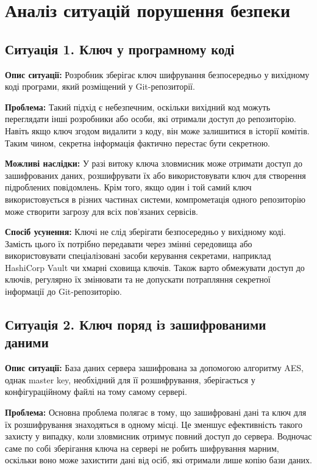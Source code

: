 \section{Аналіз ситуацій порушення безпеки}

\subsection{Ситуація 1. Ключ у програмному коді}

\textbf{Опис ситуації:}
Розробник зберігає ключ шифрування безпосередньо у вихідному коді програми, який розміщений у Git-репозиторії.

\textbf{Проблема:}
Такий підхід є небезпечним, оскільки вихідний код можуть переглядати інші розробники або особи, 
які отримали доступ до репозиторію. Навіть якщо ключ згодом видалити з коду, він може залишитися в історії комітів. 
Таким чином, секретна інформація фактично перестає бути секретною.

\textbf{Можливі наслідки:}
У разі витоку ключа зловмисник може отримати доступ до зашифрованих даних, розшифрувати їх або використовувати ключ 
для створення підроблених повідомлень. Крім того, якщо один і той самий ключ використовується в різних частинах системи, 
компрометація одного репозиторію може створити загрозу для всіх пов'язаних сервісів.

\textbf{Спосіб усунення:}
Ключі не слід зберігати безпосередньо у вихідному коді. Замість цього їх потрібно передавати через змінні середовища 
або використовувати спеціалізовані засоби керування секретами, наприклад HashiCorp Vault чи хмарні сховища ключів. 
Також варто обмежувати доступ до ключів, регулярно їх змінювати та не допускати потрапляння секретної інформації до Git-репозиторію.


\subsection{Ситуація 2. Ключ поряд із зашифрованими даними}

\textbf{Опис ситуації:}
База даних сервера зашифрована за допомогою алгоритму AES, однак master key, необхідний для її розшифрування, зберігається у конфігураційному файлі на тому самому сервері.

\textbf{Проблема:}
Основна проблема полягає в тому, що зашифровані дані та ключ для їх розшифрування знаходяться в одному місці. 
Це зменшує ефективність такого захисту у випадку, коли зловмисник отримує повний доступ до сервера. 
Водночас саме по собі зберігання ключа на сервері не робить шифрування марним, оскільки воно може захистити дані від осіб, які отримали лише копію бази даних.

